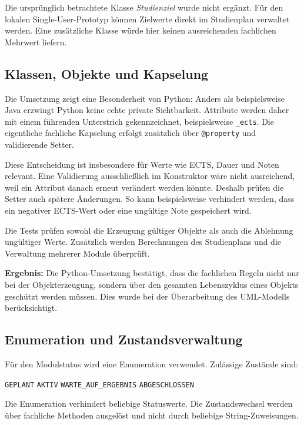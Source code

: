 \documentclass[11pt,a4paper]{article}
\begin{document}
Die ursprünglich betrachtete Klasse \textit{Studienziel} wurde nicht
ergänzt. Für den lokalen Single-User-Prototyp können Zielwerte direkt
im Studienplan verwaltet werden. Eine zusätzliche Klasse würde hier
keinen ausreichenden fachlichen Mehrwert liefern.

\subsection{Klassen, Objekte und Kapselung}

Die Umsetzung zeigt eine Besonderheit von Python: Anders als
beispielsweise Java erzwingt Python keine echte private Sichtbarkeit.
Attribute werden daher mit einem führenden Unterstrich gekennzeichnet,
beispielsweise \texttt{\_ects}. Die eigentliche fachliche Kapselung
erfolgt zusätzlich über \texttt{@property} und validierende Setter.

Diese Entscheidung ist insbesondere für Werte wie ECTS, Dauer und
Noten relevant. Eine Validierung ausschließlich im Konstruktor wäre
nicht ausreichend, weil ein Attribut danach erneut verändert werden
könnte. Deshalb prüfen die Setter auch spätere Änderungen. So kann
beispielsweise verhindert werden, dass ein negativer ECTS-Wert oder
eine ungültige Note gespeichert wird.

Die Tests prüfen sowohl die Erzeugung gültiger Objekte als auch die
Ablehnung ungültiger Werte. Zusätzlich werden Berechnungen des
Studienplans und die Verwaltung mehrerer Module überprüft.

\textbf{Ergebnis:} Die Python-Umsetzung bestätigt, dass die fachlichen
Regeln nicht nur bei der Objekterzeugung, sondern über den gesamten
Lebenszyklus eines Objekts geschützt werden müssen. Dies wurde bei der
Überarbeitung des UML-Modells berücksichtigt.
\newpage
\subsection{Enumeration und Zustandsverwaltung}

Für den Modulstatus wird eine Enumeration verwendet. Zulässige
Zustände sind:

\begin{center}
\texttt{GEPLANT} \quad
\texttt{AKTIV} \quad
\texttt{WARTE\_AUF\_ERGEBNIS} \quad
\texttt{ABGESCHLOSSEN}
\end{center}

Die Enumeration verhindert beliebige Statuswerte. Die Zustandswechsel
werden über fachliche Methoden ausgelöst und nicht durch beliebige
String-Zuweisungen.
\end{document}
